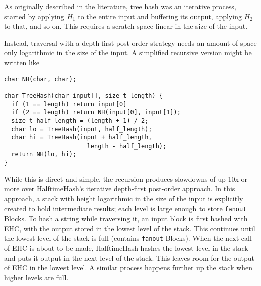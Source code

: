 \documentclass[sigconf, nonacm]{acmart}
\begin{document}



As originally described in the literature, tree hash was an iterative process, started by applying $H_1$ to the entire input and buffering its output, applying $H_2$ to that, and so on.
This requires a scratch space linear in the size of the input.

Instead, traversal with a depth-first post-order strategy needs an amount of space only logarithmic in the size of the input.
A simplified recursive version might be written like

\begin{lstlisting}
char NH(char, char);

char TreeHash(char input[], size_t length) {
  if (1 == length) return input[0]
  if (2 == length) return NH(input[0], input[1]);
  size_t half_length = (length + 1) / 2;
  char lo = TreeHash(input, half_length);
  char hi = TreeHash(input + half_length,
                       length - half_length);
  return NH(lo, hi);
}
\end{lstlisting}

While this is direct and simple, the recursion produces slowdowns of up 10x or more over HalftimeHash's iterative depth-first post-order approach.
In this approach, a stack with height logarithmic in the size of the input is explicitly created to hold intermediate results; each level is large enough to store \texttt{fanout} Blocks.
To hash a string while traversing it, an input block is first hashed with EHC, with the output stored in the lowest level of the stack.
This continues until the lowest level of the stack is full (contains \texttt{fanout} Blocks).
When the next call of EHC is about to be made, HalftimeHash hashes the lowest level in the stack and puts it output in the next level of the stack.
This leaves room for the output of EHC in the lowest level.
A similar process happens further up the stack when higher levels are full.
\end{document}
